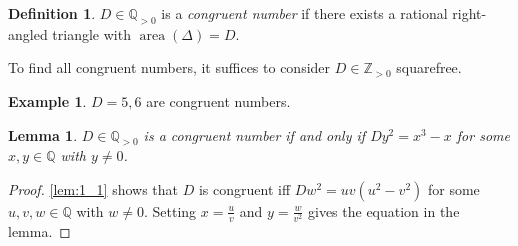 \documentclass[11pt]{article}
\theoremstyle{definition}
\newtheorem*{definition*}{Definition}
\newtheorem*{example}{Example}
\theoremstyle{plain}
\newtheorem{lemma}[definition]{Lemma}
\theoremstyle{remark}
\DeclareMathOperator{\area}{area}
\newcommand{\ZZ}{\mathbb{Z}}
\newcommand{\QQ}{\mathbb{Q}}
\begin{document}
\begin{definition*}
    $D \in \QQ_{> 0}$ is a \emph{congruent number} if there exists a rational right-angled triangle with $\area(\Delta) = D$.
\end{definition*}

\noindent To find all congruent numbers, it suffices to consider $D \in \ZZ_{>0}$ squarefree.

\begin{example}
    $D = 5, 6$ are congruent numbers.
\end{example}

\begin{lemma}\label{lem:1_2}
    $D \in \QQ_{> 0}$ is a congruent number if and only if $D y^2 = x^3 - x$ for some $x, y \in \QQ$ with $y \neq 0$.
\end{lemma}
\begin{proof}
    \autoref{lem:1_1} shows that $D$ is congruent iff $D w^2 = u v (u^2 - v^2)$ for some $u, v, w \in \QQ$ with $w \neq 0$. Setting $x =\frac{u}{v}$ and $y = \frac{w}{v^2}$ gives the equation in the lemma.
\end{proof}
\end{document}
